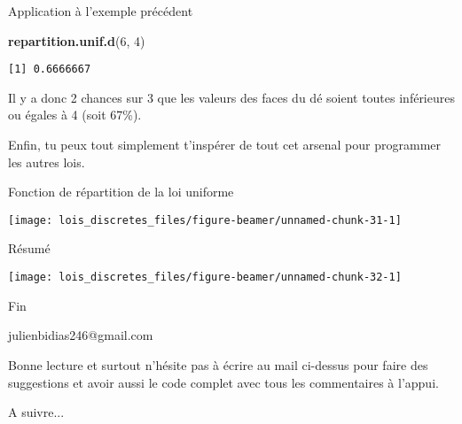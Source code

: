 \documentclass[
  ignorenonframetext,
]{beamer}
\newenvironment{Shaded}{\begin{snugshade}}{\end{snugshade}}
\newcommand{\DecValTok}[1]{\textcolor[rgb]{0.00,0.00,0.81}{#1}}
\newcommand{\FunctionTok}[1]{\textcolor[rgb]{0.13,0.29,0.53}{\textbf{#1}}}
\newcommand{\NormalTok}[1]{#1}
\begin{document}
\begin{frame}[fragile]{Application à l'exemple précédent}
\protect\hypertarget{application-uxe0-lexemple-pruxe9cuxe9dent}{}
\begin{Shaded}
\begin{Highlighting}[]
\FunctionTok{repartition.unif.d}\NormalTok{(}\DecValTok{6}\NormalTok{, }\DecValTok{4}\NormalTok{)}
\end{Highlighting}
\end{Shaded}

\begin{verbatim}
[1] 0.6666667
\end{verbatim}

Il y a donc 2 chances sur 3 que les valeurs des faces du dé soient
toutes inférieures ou égales à 4 (soit 67\%).

Enfin, tu peux tout simplement t'inspérer de tout cet arsenal pour
programmer les autres lois.
\end{frame}

\begin{frame}{Fonction de répartition de la loi uniforme}
\protect\hypertarget{fonction-de-ruxe9partition-de-la-loi-uniforme}{}
\begin{center}\texttt{[image: lois\_discretes\_files/figure-beamer/unnamed-chunk-31-1]} \end{center}
\end{frame}

\begin{frame}{Résumé}
\protect\hypertarget{ruxe9sumuxe9}{}
\begin{center}\texttt{[image: lois\_discretes\_files/figure-beamer/unnamed-chunk-32-1]} \end{center}
\end{frame}

\begin{frame}{Fin}
\protect\hypertarget{fin}{}
\begin{alertblock}{julienbidias246@gmail.com}

Bonne lecture et surtout n'hésite pas à écrire au mail ci-dessus pour faire des suggestions et avoir aussi le code complet avec tous les commentaires à l'appui.

\vspace{3mm}
A suivre...

\end{alertblock}
\end{frame}
\end{document}
